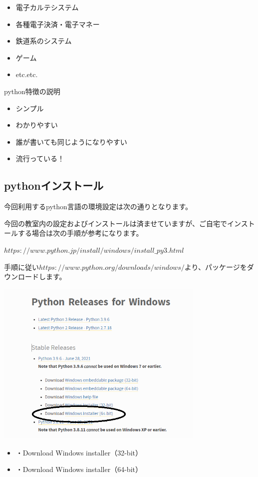 \documentclass[11pt,a4paper,dvipdfmx,titlepage]{jsreport}
\begin{document}
\begin{itemize}
 \item 電子カルテシステム 
 \item 各種電子決済・電子マネー
 \item 鉄道系のシステム
 \item ゲーム
 \item etc.etc.
\end{itemize}

python特徴の説明
\begin{itemize}
 \item シンプル
 \item わかりやすい
 \item 誰が書いても同じようになりやすい
 \item 流行っている！
\end{itemize}

\subsection{pythonインストール}
今回利用するpython言語の環境設定は次の通りとなります。

今回の教室内の設定およびインストールは済ませていますが、ご自宅でインストールする場合は次の手順が参考になります。

\begin{description}
	\item $https://www.python.jp/install/windows/install\_py3.html$
\end{description}

手順に従い$https://www.python.org/downloads/windows/$より、パッケージをダウンロードします。

\includegraphics[width=10cm]{images/image11.png}

\begin{itemize}
	\item ・Download Windows installer（32-bit）
	\item ・Download Windows installer（64-bit）

\end{itemize}
\end{document}
